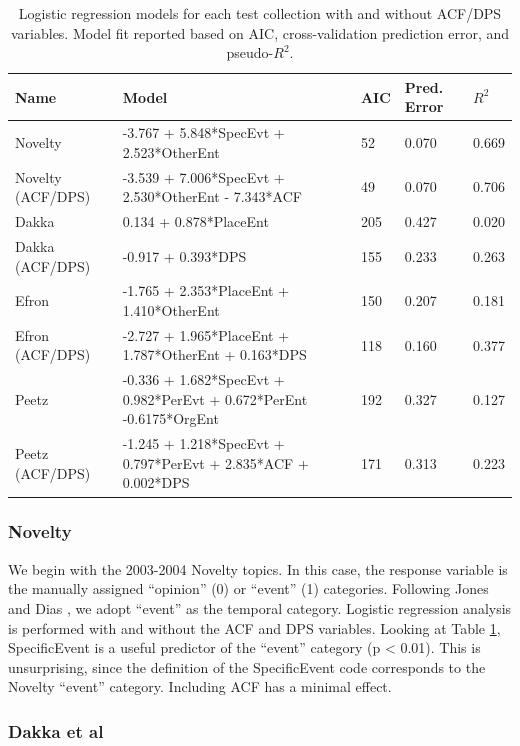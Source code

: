 \documentclass{sig-alternate}
\begin{document}
\begin{table}
\small
\begin{tabular}{| l | l | l | l | l |} \hline
\bf{Name} & \bf{Model} & \bf{AIC} & \bf{Pred. Error} & \bf{$R^2$} \\ \hline
Novelty 	&  -3.767 + 5.848*SpecEvt + 2.523*OtherEnt & 52 & 0.070 & 0.669 \\ \hline
Novelty (ACF/DPS)		&  -3.539 + 7.006*SpecEvt + 2.530*OtherEnt - 7.343*ACF & 49 & 0.070 & 0.706 \\ \hline
Dakka	&  0.134 + 0.878*PlaceEnt  & 205 & 0.427 & 0.020 \\ \hline
Dakka (ACF/DPS) 		& -0.917 + 0.393*DPS 	& 155 & 0.233 & 0.263  \\ \hline
Efron	& -1.765 + 2.353*PlaceEnt + 1.410*OtherEnt & 150 &0.207& 0.181 \\ \hline
Efron (ACF/DPS) 		& -2.727 + 1.965*PlaceEnt + 1.787*OtherEnt  + 0.163*DPS & 118 & 0.160 & 0.377 \\ \hline
Peetz & -0.336 + 1.682*SpecEvt + 0.982*PerEvt + 0.672*PerEnt -0.6175*OrgEnt & 192 & 0.327 & 0.127 \\ \hline
Peetz (ACF/DPS) 		& -1.245 + 1.218*SpecEvt + 0.797*PerEvt + 2.835*ACF + 0.002*DPS & 171 & 0.313 & 0.223 \\ \hline
\end{tabular}
\label{table.regresults}
\caption{Logistic regression models for each test collection with and without ACF/DPS variables. Model fit reported based on AIC, cross-validation prediction error, and pseudo-$R^2$.}
\end{table}

\subsubsection{Novelty}

We begin with the 2003-2004 Novelty topics. In this case, the response variable is the manually assigned ``opinion'' (0) or ``event'' (1) categories. Following Jones and Dias \cite{Jones2007}, we adopt ``event'' as the temporal category. Logistic regression analysis is performed with and without the ACF and DPS variables. Looking at Table \ref{table.regresults}, SpecificEvent is a useful predictor of the ``event'' category (p < 0.01). This is unsurprising, since the definition of the SpecificEvent code corresponds to the Novelty ``event'' category. Including ACF has a minimal effect. 

\subsubsection{Dakka et al}
\end{document}

